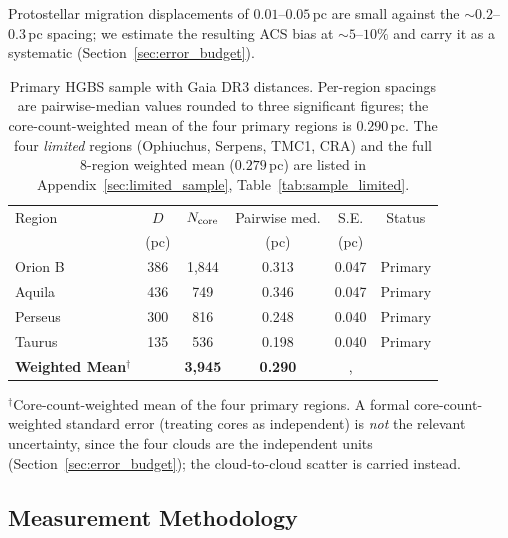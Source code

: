 \documentclass[usenatbib,twoside,twocolumn]{mnras}
\begin{document}
Protostellar migration displacements of $0.01$--$0.05$\,pc \citep{Kirk2016, Mattern2018} are small against the $\sim0.2$--$0.3$\,pc spacing; we estimate the resulting ACS bias at $\sim5$--$10\%$ and carry it as a systematic (Section~\ref{sec:error_budget}).

\begin{table}
\caption{Primary HGBS sample with Gaia DR3 distances. Per-region spacings are pairwise-median values rounded to three significant figures; the core-count-weighted mean of the four primary regions is $0.290$\,pc. The four \emph{limited} regions (Ophiuchus, Serpens, TMC1, CRA) and the full 8-region weighted mean ($0.279$\,pc) are listed in Appendix~\ref{sec:limited_sample}, Table~\ref{tab:sample_limited}.}
\label{tab:sample}
\footnotesize
\setlength{\tabcolsep}{3pt}
\begin{tabular}{lccccc}
\toprule
Region & $D$ & $N_{\rm core}$ & Pairwise med. & S.E. & Status \\
       & (pc) &  & (pc) & (pc) &  \\
\midrule
Orion B  & 386 & 1,844 & 0.313 & 0.047 & Primary \\
Aquila   & 436 & 749   & 0.346 & 0.047 & Primary \\
Perseus  & 300 & 816   & 0.248 & 0.040 & Primary \\
Taurus   & 135 & 536   & 0.198 & 0.040 & Primary \\
\midrule
\textbf{Weighted Mean}$^\dagger$ &  & \textbf{3,945} & \textbf{0.290} &, &  \\
\bottomrule
\end{tabular}
\par\vspace{2pt}
\footnotesize $^\dagger$Core-count-weighted mean of the four primary regions. A formal core-count-weighted standard error (treating cores as independent) is \emph{not} the relevant uncertainty, since the four clouds are the independent units (Section~\ref{sec:error_budget}); the cloud-to-cloud scatter is carried instead.
\end{table}

\subsection{Measurement Methodology}
\label{sec:methodology}
\end{document}
